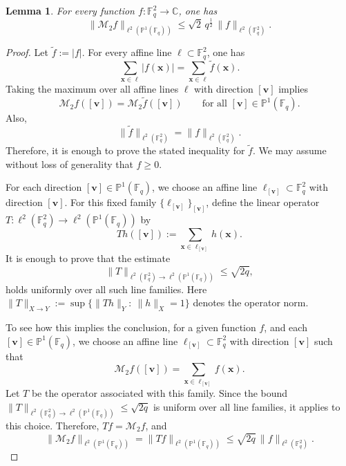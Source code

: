 \documentclass[11pt]{article}
\newtheorem{lemma}[theorem]{Lemma}
\newcommand{\F}{\mathbb{F}}
\newcommand{\1}{\mathbf 1}
\begin{document}
\begin{lemma}\label{lem:planar-l2}
For every function $f:\mathbb{F}_q^2\to\mathbb{C}$, one has
\[
\|\mathcal{M}_{2}f\|_{\ell^2(\mathbb{P}^{1}(\mathbb{F}_q))}
\le
\sqrt{2}\,q^{\frac{1}{2}}\,\|f\|_{\ell^2(\mathbb{F}_q^2)}.
\]
\end{lemma}





\begin{proof}
Let $\widetilde{f}:=|f|$. 
For every affine line $\ell\subset\mathbb{F}_q^2$, one has
\[
\sum_{\mathbf x\in\ell}|f(\mathbf x)|
=
\sum_{\mathbf x\in\ell}\tilde{f}(\mathbf x).
\]
Taking the maximum over all affine lines $\ell$ with direction $[\mathbf{v}]$ implies
\[
\mathcal{M}_{2}f([\mathbf{v}])=\mathcal{M}_{2}\tilde{f}([\mathbf{v}])
\qquad\text{for all }[\mathbf{v}]\in\mathbb{P}^1(\mathbb{F}_q).
\]
Also,
\[
\|\tilde{f}\|_{\ell^2(\mathbb{F}_q^2)}=\|f\|_{\ell^2(\mathbb{F}_q^2)}.
\]
Therefore, it is enough to prove the stated inequality for $\tilde{f}$. 
We may assume without loss of generality that $f\ge 0$.

For each direction $[\mathbf{v}]\in\mathbb{P}^1(\mathbb{F}_q)$, we choose an affine line
$\ell_{[\mathbf{v}]}\subset\mathbb{F}_q^2$ with direction $[\mathbf{v}]$. 
For this fixed family $\{\ell_{[\mathbf{v}]}\}_{[\mathbf{v}]}$, define the linear operator
$T:\ell^2(\mathbb{F}_q^2)\to \ell^2(\mathbb{P}^1(\mathbb{F}_q))$ by
\[
Th([\mathbf{v}]):=\sum_{\mathbf x\in\ell_{[\mathbf{v}]}} h(\mathbf x).
\]
It is enough to prove that the estimate 
\begin{equation}\label{eq111}
\|T\|_{\ell^2(\mathbb{F}_q^2)\to \ell^2(\mathbb{P}^1(\mathbb{F}_q))}\le \sqrt{2q},
\end{equation}
holds uniformly over all such line families. Here $\|T\|_{X\to Y}:=\sup\{\|Th\|_Y:\ \|h\|_X=1\}$ denotes the operator norm. 

To see how this implies the conclusion, for a given function $f$, and each $[\mathbf{v}]\in\mathbb{P}^1(\mathbb{F}_q)$, we choose an affine line
$\ell_{[\mathbf{v}]}\subset\mathbb{F}_q^2$ with direction $[\mathbf{v}]$ such that
\[
\mathcal{M}_{2}f([\mathbf{v}])=\sum_{\mathbf x\in \ell_{[\mathbf{v}]}} f(\mathbf x).
\]
Let $T$ be the operator associated with this family.
Since the bound $\|T\|_{\ell^2(\mathbb{F}_q^2)\to \ell^2(\mathbb{P}^1(\F_q))}\le \sqrt{2q}$ is uniform over all line families, it applies to this choice.
Therefore, $Tf=\mathcal{M}_{2}f$, and
\begin{equation} \label{eq_result_need}
\|\mathcal{M}_{2}f\|_{\ell^2(\mathbb{P}^1(\F_q))}
=
\|Tf\|_{\ell^2(\mathbb{P}^1(\mathbb{F}_q))}
\le
\sqrt{2q}\,\|f\|_{\ell^2(\mathbb{F}_q^2)}.
\end{equation}



\end{proof}
\end{document}
